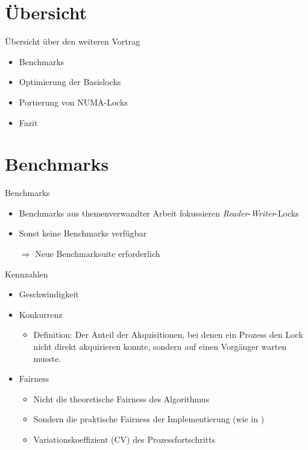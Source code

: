\documentclass[fleqn,compress,utf8,aspectratio=169,t]{beamer}
\begin{document}
\section{Übersicht}

\begin{frame}{Übersicht über den weiteren Vortrag}
    \begin{itemize}
        \item Benchmarks
        \item Optimierung der Basislocks
        \item Portierung von NUMA-Locks
        \item Fazit
    \end{itemize}
\end{frame}

\section{Benchmarks}

\begin{frame}{Benchmarks}
    \begin{itemize}
        \item Benchmarks aus themenverwandter Arbeit \cite{RMA-RW} fokussieren \textit{Reader}-\textit{Writer}-Locks
        \item Sonst keine Benchmarks verfügbar\pause
        \item[$\Rightarrow$] Neue Benchmarksuite erforderlich
    \end{itemize}
\end{frame}

\begin{frame}{Kennzahlen}
    \begin{itemize}
        \item Geschwindigkeit
        \item Konkurrenz
              \begin{itemize}
                  \item<2-> Definition: Der Anteil
                        der Akquisitionen, bei denen ein Prozess den Lock nicht direkt akquirieren konnte, sondern
                        auf einen Vorgänger warten musste.
              \end{itemize}
        \item Fairness\pause
              \begin{itemize}
                  \item<3-> Nicht die theoretische Fairness des Algorithmus
                  \item<3-> Sondern die praktische Fairness der Implementierung (wie in \cite{Cohort-Lock})
                  \item<3->[$\Rightarrow$] Variationskoeffizient (CV) des Prozessfortschritts
              \end{itemize}
    \end{itemize}
\end{frame}
\end{document}
